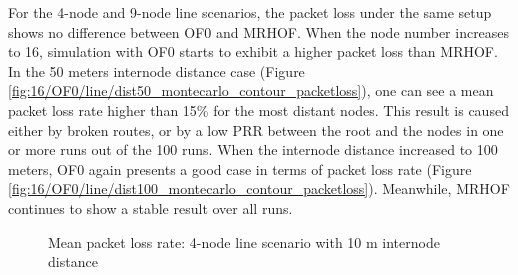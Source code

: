 For the 4-node and 9-node line scenarios, the packet loss under the same setup shows no difference between OF0 and MRHOF. When the node number increases to 16, simulation with OF0 starts to exhibit a higher packet loss than MRHOF. In the 50 meters internode distance case (Figure \ref{fig:16/OF0/line/dist50_montecarlo_contour_packetloss}), one can see a mean packet loss rate higher than 15\% for the most distant nodes. This result is caused either by broken routes, or by a low PRR between the root and the nodes in one or more runs out of the 100 runs. When the internode distance increased to 100 meters, OF0 again presents a good case in terms of packet loss rate (Figure \ref{fig:16/OF0/line/dist100_montecarlo_contour_packetloss}). Meanwhile, MRHOF continues to show a stable result over all runs.   
\begin{figure}[p]
  \centering
    \leavevmode
   \caption{Mean packet loss rate: 4-node line scenario with 10 m internode distance}
   \label{fig:pl_4_line_10}
   \vspace{-20pt}
\end{figure}

